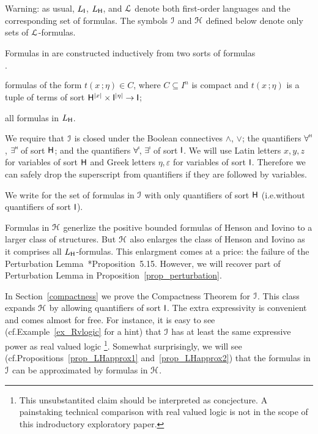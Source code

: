 \documentclass[10pt,oneside]{amsproc}
\newcommand{\mylabel}[1]{{#1}\hfill}
\renewenvironment{itemize}
  {\begin{list}{$\cdot$}{%
  \setlength{\parskip}{0mm}
  \setlength{\topsep}{.4\baselineskip}
  \setlength{\rightmargin}{0mm}
  \setlength{\listparindent}{0mm}
  \setlength{\itemindent}{0mm}
  \setlength{\labelwidth}{3ex}
  \setlength{\itemsep}{.2\baselineskip}
  \setlength{\parsep}{.2\baselineskip}
  \setlength{\partopsep}{0mm}
  \setlength{\labelsep}{1ex}
  \setlength{\leftmargin}{\labelwidth+\labelsep}
  \let\makelabel\mylabel}}{%
\end{list}}
\renewcommand*{\emph}[1]{%
   \smash{\tikz[baseline]\node[rectangle, fill=teal!25, rounded corners, inner xsep=0.5ex, inner ysep=0.2ex, anchor=base, minimum height = 2.7ex]{\strut #1};}}
\newcommand\dangersign[1][3.5ex]{%
  \renewcommand\stacktype{L}%
  \scaleto{\stackon[1.9pt]{\Huge\color{red}$\triangle$}{\color{red}\bfseries\small !}}{#1}%
}
\begin{document}
Warning: as usual, $L_{\sf I}$, $L_{\sf H}$, and ${\EuScript L}$ denote both first-order languages and the corresponding set of formulas.
The symbols ${\EuScript I}$ and ${\EuScript H}$ defined below denote only sets of ${\EuScript L}$-formulas.

\begin{definition}\label{def_LL}
  Formulas in \emph{${\EuScript I}$\/} are constructed inductively from two sorts of \emph{${\EuScript I}$-atomic\/} formulas
  \begin{itemize}
  \item[i.] formulas of the form $t(x\,;\eta)\in C$, where $C\subseteq I^n$ is compact and $t(x\,;\eta)$ is a tuple of terms of sort ${\sf H}^{|x|}\times {\sf I}^{|\eta|}\to {\sf I}$; 
  \item[ii.] all formulas in $L_{\sf H}$.
  \end{itemize}
  We require that ${\EuScript I}$ is closed under the Boolean connectives $\wedge$, $\vee$; the quantifiers $\forall\raisebox{1.1ex}{\scaleto{\sf H}{.8ex}\kern-.2ex}$, $\exists\raisebox{1.1ex}{\scaleto{\sf H}{.8ex}\kern-.2ex}$ of sort ${\sf H}$; and the quantifiers $\forall\raisebox{1.1ex}{\scaleto{\sf I}{.8ex}\kern-.2ex}$, $\exists\raisebox{1.1ex}{\scaleto{\sf I}{.8ex}\kern-.2ex}$ of sort ${\sf I}$.
  We will use Latin letters $x,y,z$ for variables of sort ${\sf H}$ and Greek letters $\eta,\varepsilon$ for variables of sort ${\sf I}$.
  Therefore we can safely drop the superscript from quantifiers if they are followed by variables.

  We write \emph{${\EuScript H}$ \/} for the set of formulas in ${\EuScript I}$ with only quantifiers of sort ${\sf H}$ (i.e.\@ without quantifiers of sort ${\sf I}$).
\end{definition}

Formulas in ${\EuScript H}$ generlize the positive bounded formulas of Henson and Iovino to a larger class of structures.
But ${\EuScript H}$ also enlarges the class of Henson and Iovino as it comprises all $L_{\sf H}$-formulas.
This enlargment comes at a price: the failure of the Perturbation Lemma~\cite{HI}*{Proposition~5.15}.
However, we will recover part of Perturbation Lemma in Proposition~\ref{prop_perturbation}.

In Section~\ref{compactness} we prove the Compactness Theorem for ${\EuScript I}$.
This class expands ${\EuScript H}$ by allowing quantifiers of sort ${\sf I}$.
The extra expressivity is convenient and comes almost for free.
For instance, it is easy to see (cf.\@ Example~\ref{ex_Rvlogic} for a hint) that ${\EuScript I}$ has at least the same expressive power as real valued logic%
\footnote{This unsubstantited claim should be interpreted as concjecture.
A painstaking technical comparison with real valued logic is not in the scope of this indroductory exploratory paper.}.
Somewhat surprisingly, we will see (cf.\@ Propositions~\ref{prop_LHapprox1} and~\ref{prop_LHapprox2}) that the formulas in ${\EuScript I}$ can be approximated by formulas in ${\EuScript H}$.
\end{document}
